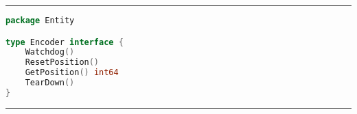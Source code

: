
\phantom{blank}
\vspace{5mm}
\hrule
\begin{lstlisting}[language=Go,caption={Encoder.go},breaklines=true,label={lst:Encoder}]
package Entity

type Encoder interface {
	Watchdog()
	ResetPosition()
	GetPosition() int64
	TearDown()
}
\end{lstlisting}
\hrule